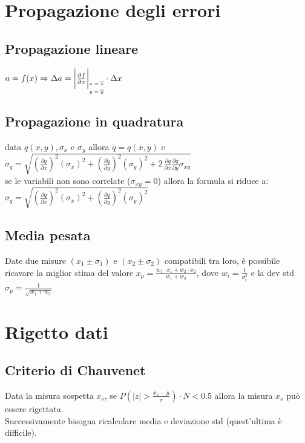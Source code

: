 \documentclass[11pt]{article}
\begin{document}
    \section{Propagazione degli errori}

    \subsection{Propagazione lineare}
    $a = f(x) \Rightarrow \Delta a = \bigg|\frac{\partial f}{\partial x}\bigg|_{
        \fontsize{5}{5}\selectfont
        \begin{aligned}
            x &=  \overline{x} \\
            y &=  \overline{y}
        \end{aligned}} \cdot \Delta x $

    \subsection{Propagazione in quadratura}
    data $ q(x, y), \sigma_x $ e $ \sigma_y $ allora $ \overline{q} = q(\overline{x}, \overline{y}) $ e
    $ \sigma_q = \sqrt{\left( \frac{\partial q}{\partial x} \right)^2 (\sigma_x)^2 +
    \left( \frac{\partial q}{\partial y} \right)^2 (\sigma_y)^2 +
    2 \, \frac{\partial q}{\partial x} \frac{\partial q}{\partial y} \sigma_{xy} } $ \\
    se le variabili non sono correlate ($ \sigma_{xy} = 0 $) allora la formula si riduce a:
    $ \sigma_q = \sqrt{\left( \frac{\partial q}{\partial x} \right)^2 (\sigma_x)^2 +
    \left( \frac{\partial q}{\partial y} \right)^2 (\sigma_y)^2 } $

    \subsection{Media pesata}
    Date due misure $ (x_1 \pm \sigma_1) $ e $ (x_2 \pm \sigma_2) $ compatibili tra loro, è possibile ricavare la miglior
    stima del valore $ x_p = \frac{w_1 \cdot x_1 + w_2 \cdot x_2}{w_1 + w_2} $, dove $w_i = \frac{1}{\sigma_i^2} $ e
    la dev std $ \sigma_p = \frac{1}{\sqrt{w_1 + w_2}} $


    \section{Rigetto dati}

    \subsection{Criterio di Chauvenet}
    Data la misura sospetta $x_s$, se $ P\left(|z| > \frac{x_s - \mu}{\sigma} \right) \cdot N < 0.5 $ allora la misura
    $x_s$ può essere rigettata.\\
    Successivamente bisogna ricalcolare media e deviazione std (quest'ultima è difficile).
\end{document}
